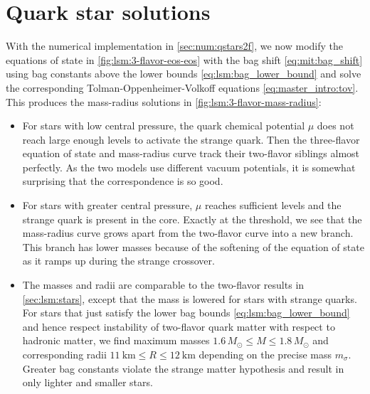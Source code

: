 \section{Quark star solutions}

With the numerical implementation in \cref{sec:num:qstars2f},
we now modify the equations of state in \cref{fig:lsm:3-flavor-eos-eos}
with the bag shift \eqref{eq:mit:bag_shift}
using bag constants above the lower bounds \eqref{eq:lsm:bag_lower_bound}
and solve the corresponding Tolman-Oppenheimer-Volkoff equations \eqref{eq:master_intro:tov}.
This produces the mass-radius solutions in \cref{fig:lsm:3-flavor-mass-radius}:
\begin{itemize}
\item For stars with low central pressure,
      the quark chemical potential $\mu$ does not reach large enough levels to activate the strange quark.
      Then the three-flavor equation of state and mass-radius curve track their two-flavor siblings almost perfectly.
      As the two models use different vacuum potentials, it is somewhat surprising that the correspondence is so good.
\item For stars with greater central pressure, $\mu$ reaches sufficient levels and the strange quark is present in the core.
      Exactly at the threshold, we see that the mass-radius curve grows apart from the two-flavor curve into a new branch.
      This branch has lower masses because of the softening of the equation of state as it ramps up during the strange crossover.
\item The masses and radii are comparable to the two-flavor results in \cref{sec:lsm:stars}, except that the mass is lowered for stars with strange quarks.
      For stars that just satisfy the lower bag bounds \eqref{eq:lsm:bag_lower_bound} and hence respect instability of two-flavor quark matter with respect to hadronic matter,
      we find maximum masses $1.6 \, M_\odot\leq M \leq 1.8 \, M_\odot$ and corresponding radii $\SI{11}{\kilo\meter} \leq R \leq \SI{12}{\kilo\meter}$ depending on the precise mass $m_\sigma$.
      Greater bag constants violate the strange matter hypothesis and result in only lighter and smaller stars.
\end{itemize}

